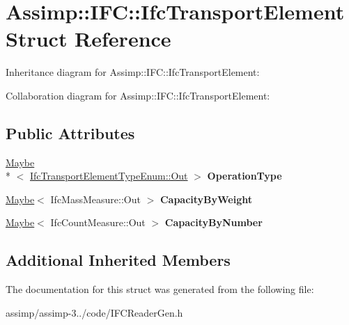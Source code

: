 \hypertarget{struct_assimp_1_1_i_f_c_1_1_ifc_transport_element}{\section{Assimp\+:\+:I\+F\+C\+:\+:Ifc\+Transport\+Element Struct Reference}
\label{struct_assimp_1_1_i_f_c_1_1_ifc_transport_element}
}


Inheritance diagram for Assimp\+:\+:I\+F\+C\+:\+:Ifc\+Transport\+Element\+:


Collaboration diagram for Assimp\+:\+:I\+F\+C\+:\+:Ifc\+Transport\+Element\+:
\subsection*{Public Attributes}
\begin{DoxyCompactItemize}
\item 
\hypertarget{struct_assimp_1_1_i_f_c_1_1_ifc_transport_element_a5d9b794edd5044f0f7d0d42563ac395d}{\hyperlink{struct_assimp_1_1_s_t_e_p_1_1_maybe}{Maybe}\\*
$<$ \hyperlink{classboost_1_1shared__ptr}{Ifc\+Transport\+Element\+Type\+Enum\+::\+Out} $>$ {\bfseries Operation\+Type}}\label{struct_assimp_1_1_i_f_c_1_1_ifc_transport_element_a5d9b794edd5044f0f7d0d42563ac395d}

\item 
\hypertarget{struct_assimp_1_1_i_f_c_1_1_ifc_transport_element_a668ba920beb7bbd60df8ddb55a82d9b9}{\hyperlink{struct_assimp_1_1_s_t_e_p_1_1_maybe}{Maybe}$<$ Ifc\+Mass\+Measure\+::\+Out $>$ {\bfseries Capacity\+By\+Weight}}\label{struct_assimp_1_1_i_f_c_1_1_ifc_transport_element_a668ba920beb7bbd60df8ddb55a82d9b9}

\item 
\hypertarget{struct_assimp_1_1_i_f_c_1_1_ifc_transport_element_a6a6b5b070abd708691f36d54fc29ee7d}{\hyperlink{struct_assimp_1_1_s_t_e_p_1_1_maybe}{Maybe}$<$ Ifc\+Count\+Measure\+::\+Out $>$ {\bfseries Capacity\+By\+Number}}\label{struct_assimp_1_1_i_f_c_1_1_ifc_transport_element_a6a6b5b070abd708691f36d54fc29ee7d}

\end{DoxyCompactItemize}
\subsection*{Additional Inherited Members}


The documentation for this struct was generated from the following file\+:\begin{DoxyCompactItemize}
\item 
assimp/assimp-\/3../code/I\+F\+C\+Reader\+Gen.\+h\end{DoxyCompactItemize}
